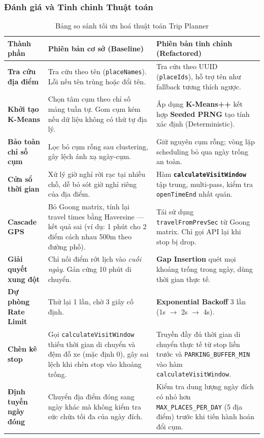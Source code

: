 \documentclass[12pt,a4paper]{article}
\begin{document}
\subsubsection{Đánh giá và Tinh chỉnh Thuật toán}

\begin{table}[htbp]
\centering
\caption{Bảng so sánh tối ưu hoá thuật toán Trip Planner}
\label{tab:algorithm_optimization}
\renewcommand{\arraystretch}{1.4}
\begin{tabular}{@{} p{} p{} p{} @{}}
\toprule
\textbf{Thành phần} & \textbf{Phiên bản cơ sở (Baseline)} & \textbf{Phiên bản tinh chỉnh (Refactored)} \\
\midrule
\textbf{Tra cứu địa điểm} & Tra cứu theo tên (\texttt{placeNames}). Lỗi nếu tên trùng hoặc đổi tên. & Tra cứu theo UUID (\texttt{placeIds}), hỗ trợ tên như fallback tương thích ngược. \\
\addlinespace
\textbf{Khởi tạo K-Means} & Chọn tâm cụm theo chỉ số mảng tuần tự. Gom cụm kém nếu dữ liệu không có thứ tự địa lý. & Áp dụng \textbf{K-Means++} kết hợp \textbf{Seeded PRNG} tạo tính xác định (Deterministic). \\
\addlinespace
\textbf{Bảo toàn chỉ số cụm} & Lọc bỏ cụm rỗng sau clustering, gây lệch ánh xạ ngày-cụm. & Giữ nguyên cụm rỗng; vòng lặp scheduling bỏ qua ngày trống an toàn. \\
\addlinespace
\textbf{Cửa sổ thời gian} & Xử lý giờ nghỉ rời rạc tại nhiều chỗ, dễ bỏ sót giờ nghỉ riêng của địa điểm. & Hàm \textbf{\texttt{calculateVisitWindow}} tập trung, multi-pass, kiểm tra \texttt{openTimeEnd} nhất quán. \\
\addlinespace
\textbf{Cascade GPS} & Bỏ Goong matrix, tính lại travel times bằng Haversine --- kết quả sai (ví dụ: 1 phút cho 2 điểm cách nhau 500m theo đường phố). & Tái sử dụng \texttt{travelFromPrevSec} từ Goong matrix. Chỉ gọi API lại khi stop bị drop. \\
\addlinespace
\textbf{Giải quyết xung đột} & Chỉ nối điểm rớt lịch vào \textit{cuối ngày}. Gán cứng 10 phút di chuyển. & \textbf{Gap Insertion} quét mọi khoảng trống trong ngày, dùng thời gian thực tế. \\
\addlinespace
\textbf{Dự phòng Rate Limit} & Thử lại 1 lần, chờ 3 giây cố định. & \textbf{Exponential Backoff} 3 lần (1s $\to$ 2s $\to$ 4s). \\
\addlinespace
\textbf{Chèn kẽ stop} & Gọi \texttt{calculateVisitWindow} thiếu thời gian di chuyển và đệm đỗ xe (mặc định 0), gây sai lệch khi chèn stop vào khoảng trống. & Truyền đầy đủ thời gian di chuyển thực tế từ stop liền trước và \texttt{PARKING\_BUFFER\_MIN} vào hàm \texttt{calculateVisitWindow}. \\
\addlinespace
\textbf{Định tuyến ngày đóng} & Chuyển địa điểm đóng sang ngày khác mà không kiểm tra sức chứa tối đa của ngày đích. & Kiểm tra dung lượng ngày đích có nhỏ hơn \texttt{MAX\_PLACES\_PER\_DAY} (5 địa điểm) trước khi tiến hành hoán đổi cụm. \\
\bottomrule
\end{tabular}
\end{table}
\end{document}
